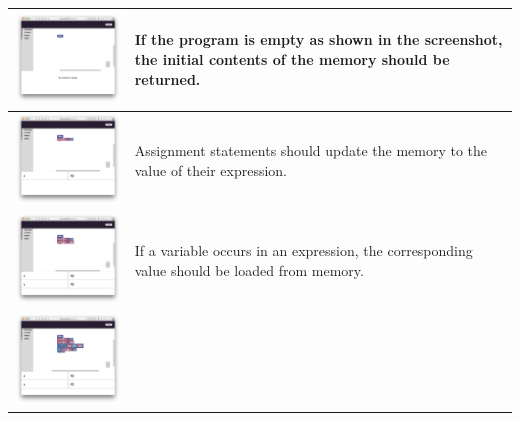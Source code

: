 \begin{center}
	\begin{longtable}[t]{|c|p{5cm}|}
		\hline 
		\includegraphics[align=t,width=250px]{cswk/0-empty.png} & 
		If the program is empty as shown in the screenshot, the initial contents of the memory should be returned. \\ \hline 
		\includegraphics[align=t,width=250px]{cswk/1-assignment.png} & 
		Assignment statements should update the memory to the value of their expression. \\ \hline 
		\includegraphics[align=t,width=250px]{cswk/2-loading.png} &
		If a variable occurs in an expression, the corresponding value should be loaded from memory. \\ \hline 
		\includegraphics[align=t,width=250px]{cswk/3-if.png} &

\end{longtable}
\end{center}
